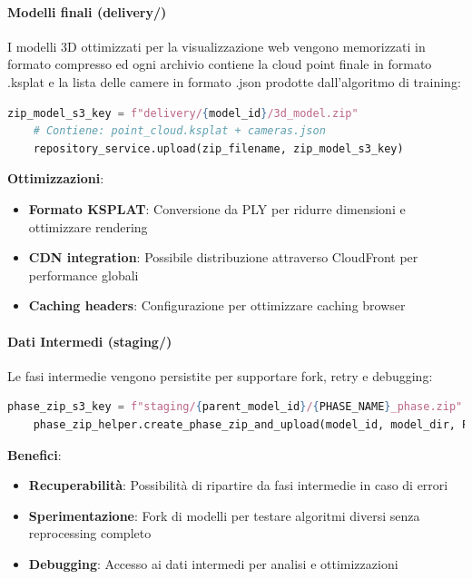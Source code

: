 \paragraph{Modelli finali (delivery/)}
I modelli 3D ottimizzati per la visualizzazione web vengono memorizzati in formato compresso ed ogni archivio contiene la cloud point finale in formato .ksplat e la lista delle camere in formato .json prodotte dall'algoritmo di training:

\begin{lstlisting}[language=python, caption=Upload modello finale]
	zip_model_s3_key = f"delivery/{model_id}/3d_model.zip"
	# Contiene: point_cloud.ksplat + cameras.json
	repository_service.upload(zip_filename, zip_model_s3_key)
\end{lstlisting}

\textbf{Ottimizzazioni}:
\begin{itemize}
	\item \textbf{Formato KSPLAT}: Conversione da PLY per ridurre dimensioni e ottimizzare rendering
	\item \textbf{CDN integration}: Possibile distribuzione attraverso CloudFront per performance globali
	\item \textbf{Caching headers}: Configurazione per ottimizzare caching browser
\end{itemize}

\paragraph{Dati Intermedi (staging/)}
Le fasi intermedie vengono persistite per supportare fork, retry e debugging:

\begin{lstlisting}[language=python, caption=Pattern salvataggio fase intermedia]
	phase_zip_s3_key = f"staging/{parent_model_id}/{PHASE_NAME}_phase.zip"
	phase_zip_helper.create_phase_zip_and_upload(model_id, model_dir, PHASE_NAME, directories)
\end{lstlisting}

\textbf{Benefici}:
\begin{itemize}
	\item \textbf{Recuperabilità}: Possibilità di ripartire da fasi intermedie in caso di errori
	\item \textbf{Sperimentazione}: Fork di modelli per testare algoritmi diversi senza reprocessing completo
	\item \textbf{Debugging}: Accesso ai dati intermedi per analisi e ottimizzazioni
\end{itemize}

